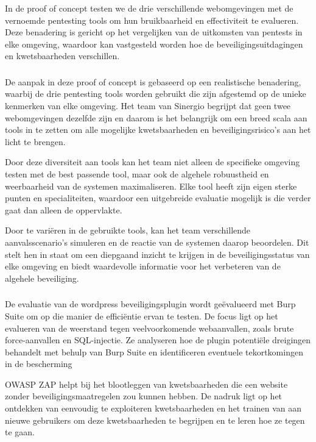 In de proof of concept testen we de drie verschillende webomgevingen met de vernoemde pentesting tools om hun bruikbaarheid en effectiviteit te evalueren. 
Deze benadering is gericht op het vergelijken van de uitkomsten van pentests in elke omgeving, waardoor kan vastgesteld worden hoe de 
beveiligingsuitdagingen en kwetsbaarheden verschillen.

\subsubsection{}
De aanpak in deze proof of concept is gebaseerd op een realistische benadering, waarbij de drie pentesting tools worden gebruikt die zijn afgestemd 
op de unieke kenmerken van elke omgeving. Het team van Sinergio begrijpt dat geen twee webomgevingen dezelfde zijn en daarom is het belangrijk om een breed scala 
aan tools in te zetten om alle mogelijke kwetsbaarheden en beveiligingsrisico's aan het licht te brengen.

Door deze diversiteit aan tools kan het team niet alleen de specifieke omgeving testen met de best passende tool, maar ook de algehele robuustheid en 
weerbaarheid van de systemen maximaliseren. Elke tool heeft zijn eigen sterke punten en specialiteiten, waardoor een uitgebreide evaluatie mogelijk 
is die verder gaat dan alleen de oppervlakte.

Door te variëren in de gebruikte tools, kan het team verschillende aanvalsscenario's simuleren en de reactie van de systemen daarop beoordelen. Dit 
stelt hen in staat om een diepgaand inzicht te krijgen in de beveiligingsstatus van elke omgeving en biedt waardevolle informatie voor het verbeteren 
van de algehele beveiliging.

\subsubsection{}
De evaluatie van de wordpress beveiligingsplugin wordt geëvalueerd met Burp Suite om op die manier de efficiëntie ervan te testen. De focus ligt op het evalueren van de weerstand 
tegen veelvoorkomende webaanvallen, zoals brute force-aanvallen en SQL-injectie. Ze analyseren hoe de plugin potentiële dreigingen behandelt met 
behulp van Burp Suite en identificeren eventuele tekortkomingen in de bescherming

OWASP ZAP helpt bij het blootleggen van kwetsbaarheden die een website zonder beveiligingsmaatregelen zou kunnen hebben. De nadruk ligt op het 
ontdekken van eenvoudig te exploiteren kwetsbaarheden en het trainen van aan nieuwe gebruikers om deze kwetsbaarheden te begrijpen en 
te leren hoe ze tegen te gaan.

